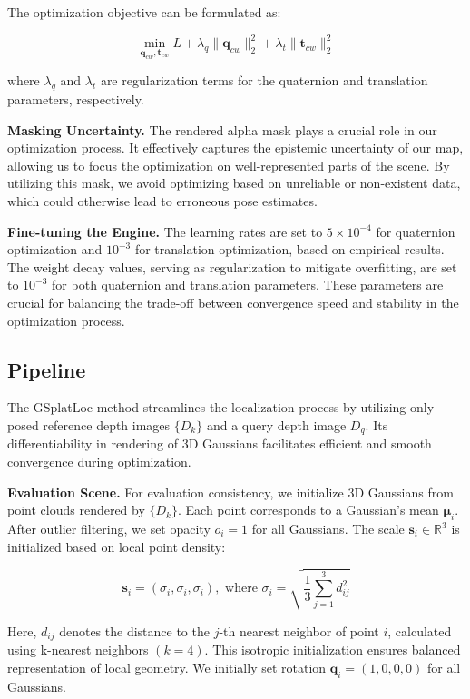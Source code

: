 \documentclass[twocolumn]{article} %
\begin{document}
The optimization objective can be formulated as:

\[
\min_{\mathbf{q}_{cw}, \mathbf{t}_{cw}} L + \lambda_q \|\mathbf{q}_{cw}\|_2^2 + \lambda_t \|\mathbf{t}_{cw}\|_2^2
\]

where \(\lambda_q\) and \(\lambda_t\) are regularization terms for the
quaternion and translation parameters, respectively.

\textbf{Masking Uncertainty.} The rendered alpha mask plays a crucial
role in our optimization process. It effectively captures the epistemic
uncertainty of our map, allowing us to focus the optimization on
well-represented parts of the scene. By utilizing this mask, we avoid
optimizing based on unreliable or non-existent data, which could
otherwise lead to erroneous pose estimates.

\textbf{Fine-tuning the Engine.} The learning rates are set to
\(5 \times 10^{-4}\) for quaternion optimization and \(10^{-3}\) for
translation optimization, based on empirical results. The weight decay
values, serving as regularization to mitigate overfitting, are set to
\(10^{-3}\) for both quaternion and translation parameters. These
parameters are crucial for balancing the trade-off between convergence
speed and stability in the optimization process.

\subsection{Pipeline}\label{pipeline}

The GSplatLoc method streamlines the localization process by utilizing
only posed reference depth images \(\{D_k\}\) and a query depth image
\(D_q\). Its differentiability in rendering of 3D Gaussians facilitates
efficient and smooth convergence during optimization.

\textbf{Evaluation Scene.} For evaluation consistency, we initialize 3D
Gaussians from point clouds rendered by \(\{D_k\}\). Each point
corresponds to a Gaussian's mean \(\boldsymbol{\mu}_i\). After outlier
filtering, we set opacity \(o_i = 1\) for all Gaussians. The scale
\(\mathbf{s}_i \in \mathbb{R}^3\) is initialized based on local point
density:

\[\mathbf{s}_i = (\sigma_i, \sigma_i, \sigma_i), \text{ where } \sigma_i = \sqrt{\frac{1}{3}\sum_{j=1}^3 d_{ij}^2}\]

Here, \(d_{ij}\) denotes the distance to the \(j\)-th nearest neighbor
of point \(i\), calculated using k-nearest neighbors \((k=4)\). This
isotropic initialization ensures balanced representation of local
geometry. We initially set rotation \(\mathbf{q}_i = (1, 0, 0, 0)\) for
all Gaussians.
\end{document}
